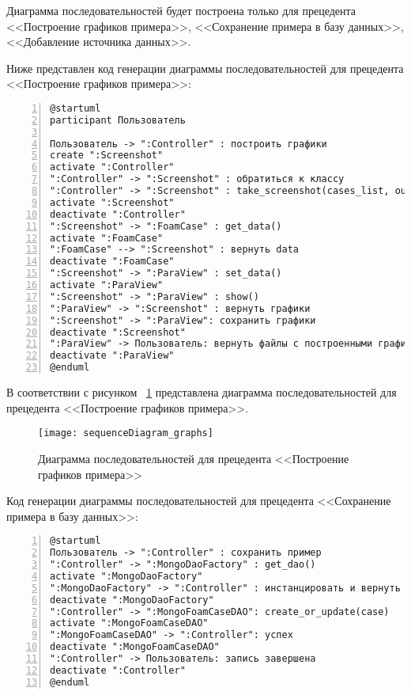 \documentclass[14pt]{extreport}
\begin{document}
Диаграмма последовательностей будет построена только для прецедента <<Построение графиков примера>>, <<Сохранение примера в базу данных>>, <<Добавление источника 
данных>>. 

Ниже представлен код генерации диаграммы последовательностей для прецедента <<Построение графиков примера>>:
\begin{Verbatim}[numbers=left,xleftmargin=5mm,fontsize=\small]
@startuml
participant Пользователь

Пользователь -> ":Controller" : построить графики
create ":Screenshot"
activate ":Controller"
":Controller" -> ":Screenshot" : обратиться к классу
":Controller" -> ":Screenshot" : take_screenshot(cases_list, output)
activate ":Screenshot"
deactivate ":Controller"
":Screenshot" -> ":FoamCase" : get_data()
activate ":FoamCase"
":FoamCase" --> ":Screenshot" : вернуть data
deactivate ":FoamCase"
":Screenshot" -> ":ParaView" : set_data()
activate ":ParaView"
":Screenshot" -> ":ParaView" : show()
":ParaView" -> ":Screenshot" : вернуть графики
":Screenshot" -> ":ParaView": сохранить графики
deactivate ":Screenshot"
":ParaView" -> Пользователь: вернуть файлы с построенными графиками
deactivate ":ParaView"
@enduml
\end{Verbatim}

В соответствии с рисунком ~\ref{fig9} представлена диаграмма последовательностей для прецедента <<Построение графиков примера>>.

\begin{figure}[H]
\centerline{\texttt{[image: sequenceDiagram\_graphs]}}
\caption{Диаграмма последовательностей для прецедента <<Построение графиков примера>>}
\label{fig9}
\end{figure}

Код генерации диаграммы последовательностей для прецедента <<Сохранение примера в базу данных>>:
\begin{Verbatim}[numbers=left,xleftmargin=5mm,fontsize=\small]
@startuml
Пользователь -> ":Controller" : сохранить пример
":Controller" -> ":MongoDaoFactory" : get_dao() 
activate ":MongoDaoFactory"
":MongoDaoFactory" -> ":Controller" : инстанцировать и вернуть экземпляр MongoFoamCaseDAO
deactivate ":MongoDaoFactory"
":Controller" -> ":MongoFoamCaseDAO": create_or_update(case)
activate ":MongoFoamCaseDAO"
":MongoFoamCaseDAO" -> ":Controller": успех
deactivate ":MongoFoamCaseDAO"
":Controller" -> Пользователь: запись завершена
deactivate ":Controller"
@enduml
\end{Verbatim}
\end{document}
